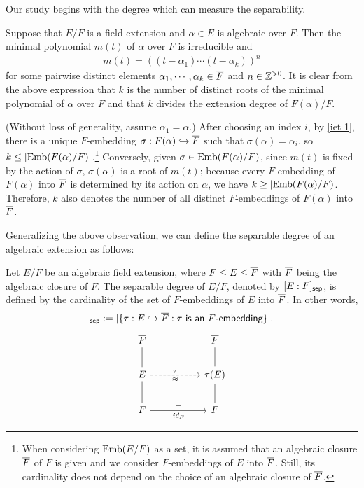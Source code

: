 Our study begins with the degree which can measure the separability.
\begin{obs}
    Suppose that $E/F$ is a field extension and $\alpha\in E$ is algebraic over $F$.
    Then the minimal polynomial $m(t)$ of $\alpha$ over $F$ is irreducible and
    \begin{align*}
        m(t)=((t-\alpha_1)\cdots(t-\alpha_k))^n
    \end{align*}
    for some pairwise distinct elements $\alpha_1, \cdots, \alpha_k\in\overline{F}$ and $n\in{\mathbb{Z}}^{>0}$.
    It is clear from the above expression that $k$ is the number of distinct roots of the minimal polynomial of $\alpha$ over $F$ and that $k$ divides the extension degree of $F(\alpha)/F$.
    
    (Without loss of generality, assume $\alpha_1=\alpha$.)
    After choosing an index $i$, by \cref{iet 1}, there is a unique $F$-embedding $\sigma: F(\alpha)\hookrightarrow\overline{F}$ such that $\sigma(\alpha)=\alpha_i$, so $k\leq|{\textrm{Emb}({F(\alpha)/F})}|$.\footnote{When considering ${\textrm{Emb}({E/F})}$ as a set, it is assumed that an algebraic closure $\overline{F}$ of $F$ is given and we consider $F$-embeddings of $E$ into $\overline{F}$. Still, its cardinality does not depend on the choice of an algebraic closure of $\overline{F}$.}
    Conversely, given $\sigma\in{\textrm{Emb}({F(\alpha)/F})}$, since $m(t)$ is fixed by the action of $\sigma$, $\sigma(\alpha)$ is a root of $m(t)$; because every $F$-embedding of $F(\alpha)$ into $\overline{F}$  is determined by its action on $\alpha$, we have $k\geq|{\textrm{Emb}({F(\alpha)/F})}$.
    Therefore, $k$ also denotes the number of all distinct $F$-embeddings of $F(\alpha)$ into $\overline{F}$.
\end{obs}
Generalizing the above observation, we can define the separable degree of an algebraic extension as follows:
\begin{defi}\label{old separable degree}
    Let $E/F$ be an algebraic field extension, where $F\leq E\leq \overline{F}$ with $\overline{F}$ being the algebraic closure of $F$.
    The separable degree of $E/F$, denoted by $[E:F]_{\textsf{sep}}$, is defined by the cardinality of the set of $F$-embeddings of $E$ into $\overline{F}$.
    In other words,
    \begin{align*}
        [E:F]_\sep:=|\{\tau: E\hookrightarrow\ol F: \textsf{$\tau$ is an $F$-embedding}\}|.
    \end{align*}
    \begin{equation*}
    \begin{tikzcd}[row sep=0.7cm, column sep=1.8cm]
        \ol F
        &
        \ol F
        \\
        E
            \arrow[u, dash]
            \arrow[r, "\tau", "\approx"', dashed]
        &
        \tau(E)
            \arrow[u, dash]
        \\
        F
            \arrow[u, dash]
            \arrow[r, "=", "\id{F}"']
        &
        F
            \arrow[u, dash]
    \end{tikzcd}
    \end{equation*}
\end{defi}

